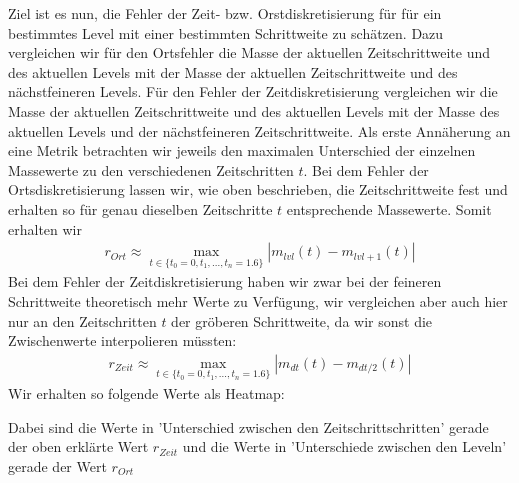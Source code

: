 Ziel ist es nun, die Fehler der Zeit- bzw. Orstdiskretisierung für für ein bestimmtes Level mit einer bestimmten Schrittweite zu schätzen. 
Dazu vergleichen wir für den Ortsfehler die Masse der aktuellen Zeitschrittweite und des aktuellen Levels mit der Masse der aktuellen Zeitschrittweite und des nächstfeineren Levels.
Für den Fehler der Zeitdiskretisierung vergleichen wir die Masse der aktuellen Zeitschrittweite und des aktuellen Levels mit der Masse des aktuellen Levels und der nächstfeineren Zeitschrittweite.
Als erste Annäherung an eine Metrik betrachten wir jeweils den maximalen Unterschied der einzelnen Massewerte zu den verschiedenen Zeitschritten $t$.
Bei dem Fehler der Ortsdiskretisierung lassen wir, wie oben beschrieben, die Zeitschrittweite fest und erhalten so für genau dieselben Zeitschritte $t$ entsprechende Massewerte. Somit erhalten wir 
\begin{align*}
	r_{Ort}  \approx \max_{t \in \{t_0 = 0,t_1,...,t_n=1.6 \}  } |m_{lvl}(t) - m_{lvl + 1} (t) |
\end{align*}
Bei dem Fehler der Zeitdiskretisierung haben wir zwar bei der feineren Schrittweite theoretisch mehr Werte zu Verfügung, wir vergleichen aber auch hier nur an den Zeitschritten $t$ der gröberen Schrittweite, da wir sonst die Zwischenwerte interpolieren müssten:
\begin{align*}
r_{Zeit}  \approx \max_{t \in \{t_0 = 0,t_1,...,t_n=1.6 \}  } |m_{dt}(t) - m_{dt/2} (t) |
\end{align*}
Wir erhalten so folgende Werte als Heatmap:
\begin{figure}[H]
	\centering
\end{figure}
Dabei sind die Werte in 'Unterschied zwischen den Zeitschrittschritten' gerade der oben erklärte Wert $r_{Zeit}$ und die Werte in  'Unterschiede zwischen den Leveln' gerade der Wert $r_{Ort}$

